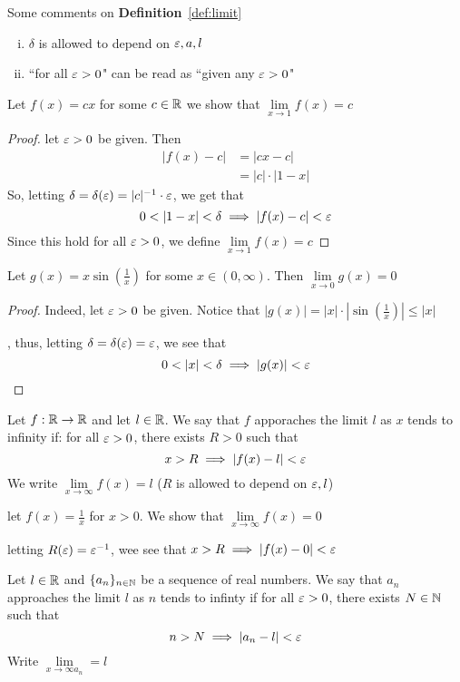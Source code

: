 Some comments on \textbf{Definition}~\ref{def:limit}
\begin{enumerate}[(i)]
    \item $\delta$ is allowed to depend on $\varepsilon, a, l$ 
    \item ``for all $\varepsilon > 0$" can be read as ``given any $\varepsilon > 0$"
\end{enumerate}

\begin{example*}
    Let $f(x) = cx$ for some $c \in \mathbb R$ we show that $\lim\limits_{x \to 1} f(x) = c$
\end{example*}
\begin{proof}
    let $\varepsilon > 0$ be given. Then 
    \begin{align*}
        |f(x)-c|&=|cx-c|\\
        &=|c|\cdot|1-x|
    \end{align*}
    So, letting $\delta=\delta(\varepsilon)=|c|^{-1}\cdot\varepsilon$, we get that
    $$0 < |1-x| < \delta \implies |f(x)-c| < \varepsilon$$
    Since this hold for all $\varepsilon > 0$, we define $\lim\limits_{x \to 1} f(x) = c$
\end{proof}

\begin{example*}
    Let $g(x) = x\sin(\frac{1}{x})$ for some $x \in (0, \infty)$. Then $\lim\limits_{x \to 0} g(x) = 0$
\end{example*}
\begin{proof}
    Indeed, let $\varepsilon > 0$ be given.
    Notice that $|g(x)| = |x|\cdot|\sin(\frac{1}{x})| \leq |x|$
    
    , thus, letting $\delta=\delta(\varepsilon)=\varepsilon$, we see that
    $$0 < |x| < \delta \implies |g(x)| < \varepsilon$$
\end{proof}

\begin{definition}
    Let $f: \mathbb R \rightarrow \mathbb R$ and let $l \in \mathbb R$. We say that $f$ apporaches the limit $l$ as $x$ tends to infinity if:
    for all $\varepsilon > 0$, there exists $R > 0$ such that 
    $$x > R \implies |f(x)-l| < \varepsilon$$
    We write $\lim\limits_{x \to \infty} f(x) = l$
    ($R$ is allowed to depend on $\varepsilon, l$)
\end{definition}

\begin{example*}
    let $f(x) = \frac{1}{x}$ for $x > 0$. We show that $\lim\limits_{x \to \infty} f(x) = 0$

    letting $R(\varepsilon)=\varepsilon^{-1}$, wee see that $x > R \implies |f(x) - 0| < \varepsilon$
\end{example*}
\begin{definition}
    Let $l \in \mathbb R$ and $\{a_n\}_{n\in\mathbb N}$ be a sequence of real numbers.
    We say that $a_n$ approaches the limit $l$ as $n$ tends to infinty if
    for all $\varepsilon > 0$, there exists $N\in \mathbb N$ such that 
    $$n > N \implies |a_n - l| < \varepsilon$$
    Write $\lim\limits_{x \to \infty a_n }= l$
\end{definition}

